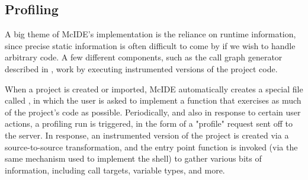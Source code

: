 \subsection{Profiling}

A big theme of McIDE's implementation is the reliance on runtime information,
since precise static information is often difficult to come by if we wish to
handle arbitrary \matlab code. A few different components, such as the call
graph generator described in , work
by executing instrumented versions of the project code.

When a project is created or imported, McIDE automatically creates a special
file called , in which the user is asked to implement
a function that exercises as much of the project's code as possible.
Periodically, and also in response to certain user actions, a profiling run is
triggered, in the form of a "profile" request sent off to the server. In
response, an instrumented version of the project is created via a
source-to-source transformation, and the entry point function is invoked (via
the same mechanism used to implement the \matlab shell) to gather various bits
of information, including call targets, variable types, and more.
